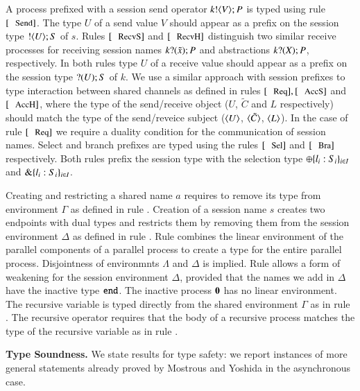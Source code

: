 A process prefixed with a session send operator $k ! \langle V \rangle ; P$
is typed using rule $\trule{Send}$.
The type $U$ of a send value $V$ should appear as a prefix
on the session type $! \langle U \rangle ; S$ of $s$.
Rules $\trule{RecvS}$ and $\trule{RecvH}$ distinguish 
two similar receive processes for
receiving session names $k ? (\tilde{x}) ; P$
and abstractions $k ? (X) ; P$, respectively.
In both rules type $U$ of a receive value should 
appear as a prefix on the session type $? (U) ; S$ of $k$.
We use a similar approach with session prefixes
to type interaction between shared channels as defined 
in rules $\trule{Req}, \trule{AccS}$ and $\trule{AccH}$,
where the type of the send/receive object 
($U$, $\tilde{C}$ and $L$ respectively) should
match the type of the send/reveice subject
($\langle U \rangle$, $\langle \tilde{C} \rangle$, $\langle L \rangle$).
In the case of rule $\trule{Req}$ we require
a duality condition for the communication of session names.
Select and branch prefixes are typed using the rules
$\trule{Sel}$ and $\trule{Bra}$ respectively. Both
rules prefix the session type with the selection
type $\oplus \{l_i: S_i\}_{i \in I}$ and
$\& \{l_i:S_i\}_{i \in I}$.

Creating and restricting a
 shared name $a$ requires to remove
its type from environment $\Gamma$ as defined in 
rule . 
Creation of a session name $s$
creates two endpoints with dual types and restricts
them by removing them from the session environment
$\Delta$ as defined in rule . Rule
 combines the linear environment of
the parallel components of a parallel process
to create a type for the entire parallel process.
Disjointness of environmnts $\Lambda$ and $\Delta$
is implied. Rule  allows a form of weakening 
for the session environment $\Delta$, provided that
the names we add in $\Delta$ have the inactive
type $\mathtt{end}$. The inactive process $\mathbf{0}$ has no
linear environment. The recursive variable is typed
directly from the shared environment $\Gamma$ as
in rule .
The recursive operator requires that the body of
a recursive process matches the type of the recursive
variable as in rule . 



{\bf Type Soundness.}
We state results for type safety:
we report instances of more general statements already proved by
Mostrous and Yoshida in the asynchronous case.

